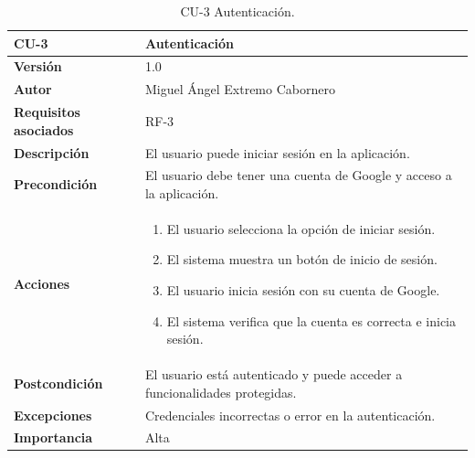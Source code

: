 \begin{table}[p]
    \centering
    \begin{tabularx}{\linewidth}{ p{} p{} }
        \toprule
        \textbf{CU-3}    & \textbf{Autenticación}\\
        \toprule
        \textbf{Versión}              & 1.0    \\
        \textbf{Autor}                & Miguel Ángel Extremo Cabornero \\
        \textbf{Requisitos asociados} & RF-3 \\
        \textbf{Descripción}          & El usuario puede iniciar sesión en la aplicación. \\
        \textbf{Precondición}         & El usuario debe tener una cuenta de Google y acceso a la aplicación. \\
        \textbf{Acciones}             &
        \begin{enumerate}
            \item El usuario selecciona la opción de iniciar sesión.
            \item El sistema muestra un botón de inicio de sesión.
            \item El usuario inicia sesión con su cuenta de Google.
            \item El sistema verifica que la cuenta es correcta e inicia sesión.
        \end{enumerate}\\
        \textbf{Postcondición}        & El usuario está autenticado y puede acceder a funcionalidades protegidas. \\
        \textbf{Excepciones}          & Credenciales incorrectas o error en la autenticación. \\
        \textbf{Importancia}          & Alta \\
        \bottomrule
    \end{tabularx}
    \caption{CU-3 Autenticación.}
\end{table}

